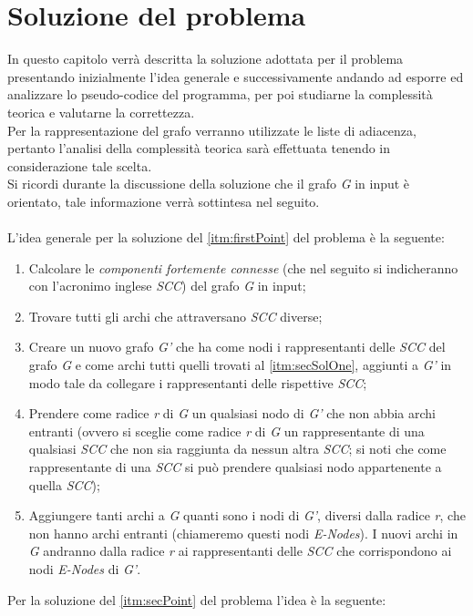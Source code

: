 \documentclass[10pt,a4paper,oneside,article,italian]{memoir}
\newcommand{\capitolo}{\newpage\chapter}
\theoremstyle{definition}
\begin{document}
\capitolo{Soluzione del problema}
In questo capitolo verrà descritta la soluzione adottata per il problema presentando inizialmente l'idea generale e successivamente andando ad esporre ed analizzare lo pseudo-codice del programma, per poi studiarne la complessità teorica e valutarne la correttezza.\\
Per la rappresentazione del grafo verranno utilizzate le liste di adiacenza, pertanto l'analisi della complessità teorica sarà effettuata tenendo in considerazione tale scelta.\\
Si ricordi durante la discussione della soluzione che il grafo \textit{G} in input è orientato, tale informazione verrà sottintesa nel seguito.\\\\
L'idea generale per la soluzione del \cref{itm:firstPoint} del problema è la seguente:
\begin{enumerate}[label=(\arabic*)]
\item \label{itm:firSolOne} Calcolare le \textit{componenti fortemente connesse} (che nel seguito si indicheranno con l'acronimo inglese \textit{SCC}) del grafo \textit{G} in input;
\item \label{itm:secSolOne} Trovare tutti gli archi che attraversano \textit{SCC} diverse;
\item \label{itm:thiSolOne} Creare un nuovo grafo \textit{G'} che ha come nodi i rappresentanti delle \textit{SCC} del grafo \textit{G} e come archi tutti quelli trovati al \cref{itm:secSolOne}, aggiunti a \textit{G'} in modo tale da collegare i rappresentanti delle rispettive \textit{SCC};
\item \label{itm:fouSolOne} Prendere come radice \textit{r} di \textit{G} un qualsiasi nodo di \textit{G'} che non abbia archi entranti (ovvero si sceglie come radice \textit{r} di \textit{G} un rappresentante di una qualsiasi \textit{SCC} che non sia raggiunta da nessun altra \textit{SCC}; si noti che come rappresentante di una \textit{SCC} si può prendere qualsiasi nodo appartenente a quella \textit{SCC});
\item \label{itm:fifSolOne} Aggiungere tanti archi a \textit{G} quanti sono i nodi di \textit{G'}, diversi dalla radice \textit{r}, che non hanno archi entranti (chiameremo questi nodi \textit{E-Nodes}). I nuovi archi in \textit{G} andranno dalla radice \textit{r} ai rappresentanti delle \textit{SCC} che corrispondono ai nodi \textit{E-Nodes} di \textit{G'}.
\end{enumerate}
Per la soluzione del \cref{itm:secPoint} del problema l'idea è la seguente:
\end{document}
